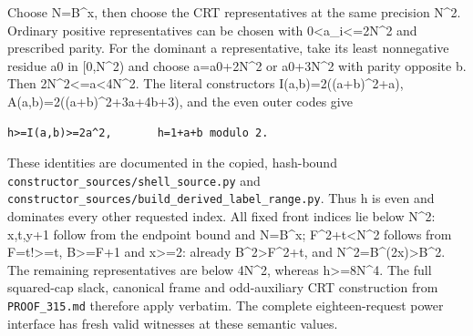 Choose N=\allowbreak{}B\textasciicircum{}\allowbreak{}x, then choose the CRT representatives at the same precision N\textasciicircum{}\allowbreak{}2. Ordinary positive representatives can be chosen with 0\textless{}\allowbreak{}a\_\allowbreak{}i\textless{}\allowbreak{}=\allowbreak{}2N\textasciicircum{}\allowbreak{}2 and prescribed parity. For the dominant a representative, take its least nonnegative residue a0 in [0,N\textasciicircum{}\allowbreak{}2) and choose a=\allowbreak{}a0+\allowbreak{}2N\textasciicircum{}\allowbreak{}2 or a0+\allowbreak{}3N\textasciicircum{}\allowbreak{}2 with parity opposite b. Then 2N\textasciicircum{}\allowbreak{}2\textless{}\allowbreak{}=\allowbreak{}a\textless{}\allowbreak{}4N\textasciicircum{}\allowbreak{}2. The literal constructors I(a,b)=\allowbreak{}2((a+\allowbreak{}b)\textasciicircum{}\allowbreak{}2+\allowbreak{}a), A(a,b)=\allowbreak{}2((a+\allowbreak{}b)\textasciicircum{}\allowbreak{}2+\allowbreak{}3a+\allowbreak{}4b+\allowbreak{}3), and the even outer codes give



\begin{verbatim}
h>=I(a,b)>=2a^2,       h=1+a+b modulo 2.
\end{verbatim}

These identities are documented in the copied, hash-bound \texttt{constructor\_\allowbreak{}sources/\allowbreak{}shell\_\allowbreak{}source.py} and \texttt{constructor\_\allowbreak{}sources/\allowbreak{}build\_\allowbreak{}derived\_\allowbreak{}label\_\allowbreak{}range.py}. Thus h is even and dominates every other requested index. All fixed front indices lie below N\textasciicircum{}\allowbreak{}2: x,t,y+\allowbreak{}1 follow from the endpoint bound and N=\allowbreak{}B\textasciicircum{}\allowbreak{}x; F\textasciicircum{}\allowbreak{}2+\allowbreak{}t\textless{}\allowbreak{}N\textasciicircum{}\allowbreak{}2 follows from F=\allowbreak{}t!\textgreater{}\allowbreak{}=\allowbreak{}t, B\textgreater{}\allowbreak{}=\allowbreak{}F+\allowbreak{}1 and x\textgreater{}\allowbreak{}=\allowbreak{}2: already B\textasciicircum{}\allowbreak{}2\textgreater{}\allowbreak{}F\textasciicircum{}\allowbreak{}2+\allowbreak{}t, and N\textasciicircum{}\allowbreak{}2=\allowbreak{}B\textasciicircum{}\allowbreak{}(2x)\textgreater{}\allowbreak{}B\textasciicircum{}\allowbreak{}2. The remaining representatives are below 4N\textasciicircum{}\allowbreak{}2, whereas h\textgreater{}\allowbreak{}=\allowbreak{}8N\textasciicircum{}\allowbreak{}4. The full squared-cap slack, canonical frame and odd-auxiliary CRT construction from \texttt{PROOF\_\allowbreak{}315.md} therefore apply verbatim. The complete eighteen-request power interface has fresh valid witnesses at these semantic values.




